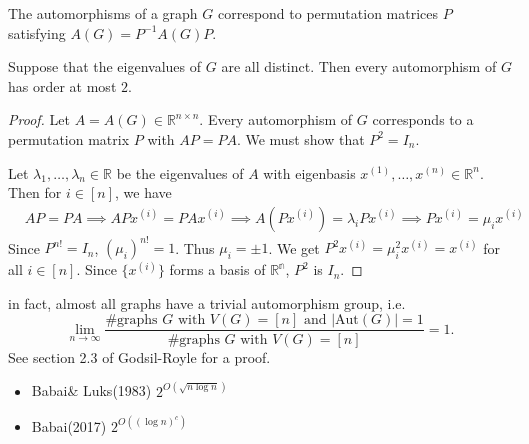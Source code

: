 \begin{corollary}
The automorphisms of a graph $G$ correspond to permutation matrices $P$ satisfying $A(G)=P^{-1}A(G)P$.
\end{corollary}

\begin{theorem}
Suppose that the eigenvalues of $G$ are all distinct. Then every automorphism of $G$ has order at most $2$.
\end{theorem}

\begin{proof}
Let $A=A(G)\in\mathbb{R}^{n\times n}$. Every automorphism of $G$ corresponds to a permutation matrix $P$ with $AP=PA$. We must show that $P^2=I_n$.

Let $\lambda_1,\ldots,\lambda_n\in\mathbb{R}$ be the eigenvalues of $A$ with eigenbasis $x^{(1)},\ldots,x^{(n)}\in\mathbb{R}^n$. Then for $i\in[n]$, we have 
\begin{align*}
&AP=PA\implies APx^{(i)}=PAx^{(i)}\implies A(Px^{(i)})=\lambda_i Px^{(i)}
\implies  Px^{(i)}=\mu_i x^{(i)}
\end{align*}
Since $P^{n!}=I_n$, $(\mu_i)^{n!}=1$. Thus $\mu_i=\pm 1$. We get $P^2x^{(i)}=\mu_i^2x^{(i)}=x^{(i)}$ for all $i\in[n]$. Since $\{x^{(i)}\}$ forms a basis of $\mathbb{R^n}$, $P^2$ is $I_n$.
\end{proof}
\begin{remark}
in fact, almost all graphs have a trivial automorphism group, i.e.
\[\lim_{n\to\infty}\frac{\#\textrm{graphs $G$ with $V(G)=[n]$ and $\left|\mathrm{Aut}(G)\right|=1$}}{\#\textrm{graphs $G$ with $V(G)=[n]$}}=1.\]
See section 2.3 of Godsil-Royle for a proof.
\end{remark}
\begin{remark}
\begin{flushleft}\end{flushleft}
\begin{itemize}
\item Babai\& Luks(1983)  $2^{O(\sqrt{n\log n})}$
\item Babai(2017)  $2^{O((\log n)^c)}$
\end{itemize}
\end{remark}